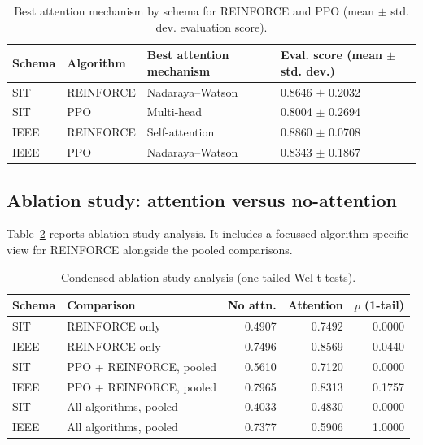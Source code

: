 \documentclass[sn-basic]{sn-jnl}%
\begin{document}
\begin{table}[htbp]
\centering
	\caption{Best attention mechanism by schema for \textsc{REINFORCE} and \textsc{PPO} (mean $\pm$ std. dev. evaluation score).}
	\label{tab:best_mech_ppo_rf}
	\begin{tabular}{l l l l}
	\toprule
	\textbf{Schema} & \textbf{Algorithm} & \textbf{Best attention mechanism} & \textbf{Eval. score (mean $\pm$ std. dev.)}\\
	\midrule
	SIT & \textsc{REINFORCE} & Nadaraya--Watson & 0.8646 $\pm$ 0.2032\\
	SIT & \textsc{PPO} & Multi-head & 0.8004 $\pm$ 0.2694\\
	IEEE & \textsc{REINFORCE} & Self-attention & 0.8860 $\pm$ 0.0708\\
	IEEE & \textsc{PPO} & Nadaraya--Watson & 0.8343 $\pm$ 0.1867\\
	\bottomrule
	\end{tabular}
\end{table}


\subsection{Ablation study: attention versus no-attention} \label{sec:ablation_results} %

Table~\ref{tab:ablation_condensed} reports ablation study analysis. It includes a focussed algorithm-specific view for \textsc{REINFORCE} alongside the pooled comparisons.

\begin{table}[htbp]
	\centering
	\caption{Condensed ablation study analysis (one-tailed Wel t-tests).}
	\label{tab:ablation_condensed}
	\begin{tabular}{l l r r r}
		\toprule
		\textbf{Schema} & \textbf{Comparison} & \textbf{No attn.} & \textbf{Attention} & \textbf{$p$ (1-tail)}\\
		\midrule
		SIT & \textsc{REINFORCE} only & 0.4907 & 0.7492 & 0.0000\\
		IEEE & \textsc{REINFORCE} only & 0.7496 & 0.8569 & 0.0440\\
		SIT & PPO + \textsc{REINFORCE}, pooled & 0.5610 & 0.7120 & 0.0000\\
		IEEE & PPO + \textsc{REINFORCE}, pooled & 0.7965 & 0.8313 & 0.1757\\
		SIT & All algorithms, pooled & 0.4033 & 0.4830 & 0.0000\\
		IEEE & All algorithms, pooled & 0.7377 & 0.5906 & 1.0000\\
		\bottomrule
	\end{tabular}
\end{table}
\end{document}
